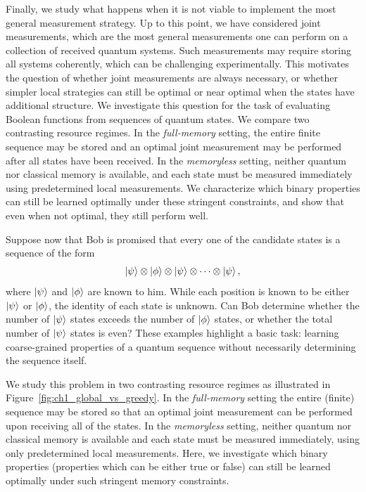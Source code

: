 Finally, we study what happens when it is not viable to implement the most general measurement strategy. 
Up to this point, we have considered joint measurements, which are the most general measurements one can perform on a collection of received quantum systems. 
Such measurements may require storing all systems coherently, which can be challenging experimentally. 
This motivates the question of whether joint measurements are always necessary, or whether simpler local strategies can still be optimal or near optimal when the states have additional structure. 
We investigate this question for the task of evaluating Boolean functions from sequences of quantum states. 
We compare two contrasting resource regimes. 
In the \emph{full-memory} setting, the entire finite sequence may be stored and an optimal joint measurement may be performed after all states have been received. 
In the \emph{memoryless} setting, neither quantum nor classical memory is available, and each state must be measured immediately using predetermined local measurements. 
We characterize which binary properties can still be learned optimally under these stringent constraints, and show that even when not optimal, they still perform well.

Suppose now that Bob is promised that every one of the candidate states is a sequence of the form
\begin{equation}
    \ket{\psi} \otimes \ket{\phi} \otimes \ket{\psi} \otimes \cdots \otimes \ket{\psi},
\end{equation}
where $\ket{\psi}$ and $\ket{\phi}$ are known to him.
While each position is known to be either $\ket{\psi}$ or $\ket{\phi}$, the identity of each state is unknown.
Can Bob determine whether the number of $\ket{\psi}$ states exceeds the number of $\ket{\phi}$ states, or whether the total number of $\ket{\psi}$ states is even?
These examples highlight a basic task: learning coarse-grained properties of a quantum sequence without necessarily determining the sequence itself.

We study this problem in two contrasting resource regimes as illustrated in Figure~\ref{fig:ch1_global_vs_greedy}.
In the \emph{full-memory} setting the entire (finite) sequence may be stored so that an optimal joint measurement can be performed upon receiving all of the states.
In the \emph{memoryless} setting, neither quantum nor classical memory is available and each state must be measured immediately, using only predetermined local measurements.
Here, we investigate which binary properties (properties which can be either true or false) can still be learned optimally under such stringent memory constraints.

